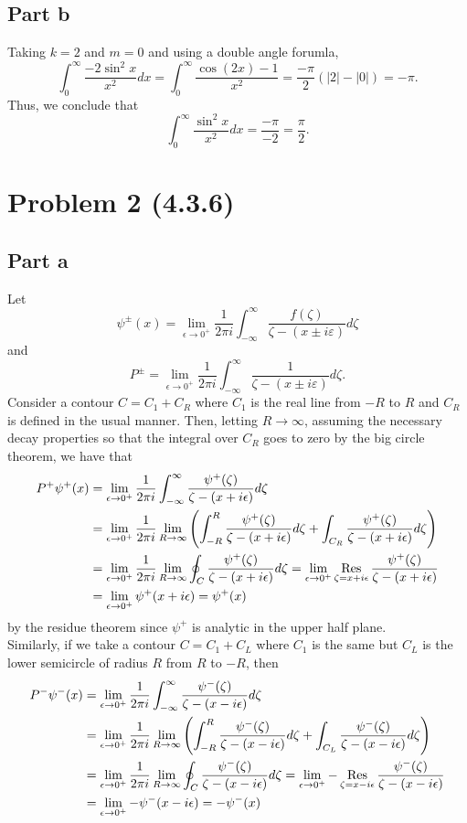 \documentclass{article}
\begin{document}
\subsection{Part b}
Taking $k=2$ and $m=0$ and using a double angle forumla,
\[
\int_0^\infty\frac{-2\sin^2x}{x^2}dx=\int_0^\infty\frac{\cos(2x)-1}{x^2}=\frac{-\pi}{2}(|2|-|0|)=-\pi.
\]
Thus, we conclude that 
\[
\int_0^\infty\frac{\sin^2x}{x^2}dx=\frac{-\pi}{-2}=\frac{\pi}{2}.
\]

\section{Problem 2 (4.3.6)} 
\subsection{Part a}
Let \[
    \psi^{\pm}(x) = \lim_{\epsilon\to 0^+}\frac{1}{2\pi i}\int_{-\infty}^\infty \frac{f(\zeta)}{\zeta- (x \pm i\varepsilon)}d\zeta
    \]
    and \[
        P^{\pm}=\lim_{\epsilon\to 0^+}\frac{1}{2\pi i}\int_{-\infty}^\infty \frac{1}{\zeta - (x\pm i\varepsilon)} d \zeta.
        \]
Consider a contour $C=C_1+C_R$ where $C_1$ is the real line from $-R$ to $R$ and $C_R$ is defined in the usual manner. Then, letting $R\to\infty$, assuming the necessary decay properties so that the integral over $C_R$ goes to zero by the big circle theorem, we have that 
\begin{align*}
P^+\psi^+(x)&=\lim_{\epsilon\to0^+}\frac{1}{2\pi i}\int_{-\infty}^\infty\frac{\psi^+(\zeta)}{\zeta-(x+i\epsilon)}d\zeta\\&=
\lim_{\epsilon\to0^+}\frac{1}{2\pi i}\lim_{R\to\infty}\left(\int_{-R}^R\frac{\psi^+(\zeta)}{\zeta-(x+i\epsilon)}d\zeta+\int_{C_R}\frac{\psi^+(\zeta)}{\zeta-(x+i\epsilon)}d\zeta\right)\\&=
\lim_{\epsilon\to0^+}\frac{1}{2\pi i}\lim_{R\to\infty}\oint_C\frac{\psi^+(\zeta)}{\zeta-(x+i\epsilon)}d\zeta=\lim_{\epsilon\to0^+}\operatorname*{Res}_{\zeta=x+i\epsilon}\frac{\psi^+(\zeta)}{\zeta-(x+i\epsilon)}\\&=
\lim_{\epsilon\to0^+}\psi^+(x+i\epsilon)=\psi^+(x)
\end{align*}
by the residue theorem since $\psi^+$ is analytic in the upper half plane. \\
Similarly, if we take a contour $C=C_1+C_L$ where $C_1$ is the same but $C_L$ is the lower semicircle of radius $R$ from $R$ to $-R$, then
\begin{align*}
P^-\psi^-(x)&=\lim_{\epsilon\to0^+}\frac{1}{2\pi i}\int_{-\infty}^\infty\frac{\psi^-(\zeta)}{\zeta-(x-i\epsilon)}d\zeta\\&=
\lim_{\epsilon\to0^+}\frac{1}{2\pi i}\lim_{R\to\infty}\left(\int_{-R}^R\frac{\psi^-(\zeta)}{\zeta-(x-i\epsilon)}d\zeta+\int_{C_L}\frac{\psi^-(\zeta)}{\zeta-(x-i\epsilon)}d\zeta\right)\\&=
\lim_{\epsilon\to0^+}\frac{1}{2\pi i}\lim_{R\to\infty}\oint_C\frac{\psi^-(\zeta)}{\zeta-(x-i\epsilon)}d\zeta=\lim_{\epsilon\to0^+}-\operatorname*{Res}_{\zeta=x-i\epsilon}\frac{\psi^-(\zeta)}{\zeta-(x-i\epsilon)}\\&=
\lim_{\epsilon\to0^+}-\psi^-(x-i\epsilon)=-\psi^-(x)
\end{align*}
\end{document}
